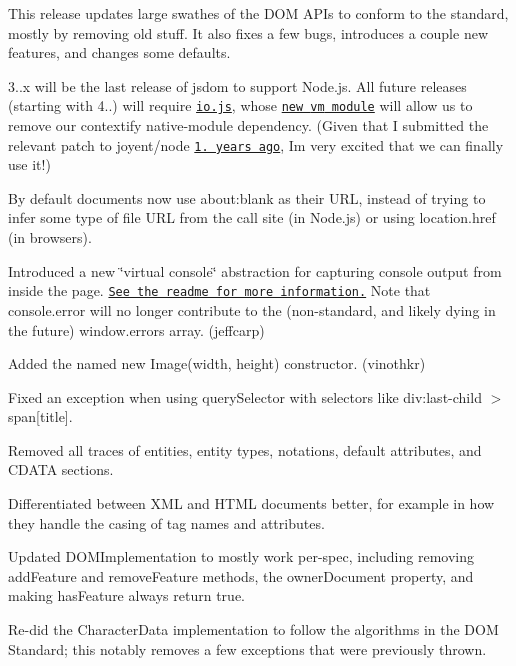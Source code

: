 This release updates large swathes of the D\+OM A\+P\+Is to conform to the standard, mostly by removing old stuff. It also fixes a few bugs, introduces a couple new features, and changes some defaults.

3..\+x will be the last release of jsdom to support Node.\+js. All future releases (starting with 4..) will require \href{https://iojs.org/}{\tt io.\+js}, whose \href{https://github.com/iojs/io.js/blob/v1.x/CHANGELOG.md#vm}{\tt new {\ttfamily vm} module} will allow us to remove our contextify native-\/module dependency. (Given that I submitted the relevant patch to joyent/node \href{https://github.com/joyent/node/commit/7afdba6e0bc3b69c2bf5fdbd59f938ac8f7a64c5}{\tt 1. years ago}, I\textquotesingle{}m very excited that we can finally use it!)


\begin{DoxyItemize}
\item By default documents now use {\ttfamily about\+:blank} as their U\+RL, instead of trying to infer some type of file U\+RL from the call site (in Node.\+js) or using {\ttfamily location.\+href} (in browsers).
\item Introduced a new \char`\"{}virtual console\char`\"{} abstraction for capturing console output from inside the page. \href{https://github.com/tmpvar/jsdom#capturing-console-output}{\tt See the readme for more information.} Note that {\ttfamily console.\+error} will no longer contribute to the (non-\/standard, and likely dying in the future) {\ttfamily window.\+errors} array. (jeffcarp)
\item Added the named {\ttfamily new Image(width, height)} constructor. (vinothkr)
\item Fixed an exception when using {\ttfamily query\+Selector} with selectors like {\ttfamily div\+:last-\/child $>$ span\mbox{[}title\mbox{]}}.
\item Removed all traces of entities, entity types, notations, default attributes, and C\+D\+A\+TA sections.
\item Differentiated between X\+ML and H\+T\+ML documents better, for example in how they handle the casing of tag names and attributes.
\item Updated {\ttfamily D\+O\+M\+Implementation} to mostly work per-\/spec, including removing {\ttfamily add\+Feature} and {\ttfamily remove\+Feature} methods, the {\ttfamily owner\+Document} property, and making {\ttfamily has\+Feature} always return {\ttfamily true}.
\item Re-\/did the {\ttfamily Character\+Data} implementation to follow the algorithms in the D\+OM Standard; this notably removes a few exceptions that were previously thrown.

\end{DoxyItemize}
